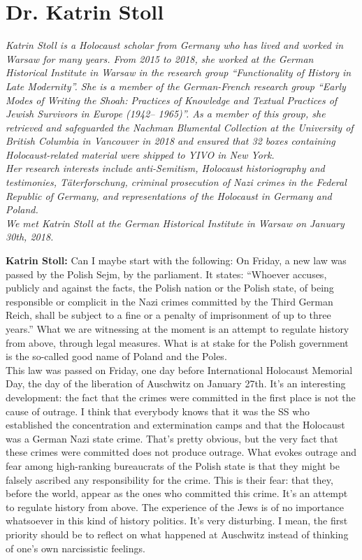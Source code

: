 \section{Dr. Katrin Stoll} 

\textit{Katrin Stoll is a Holocaust scholar from Germany who has lived and worked in Warsaw for many years. From 2015 to 2018, she worked at the German Historical Institute in Warsaw in the research group ``Functionality of History in Late Modernity''. She is a member of the German-French research group ``Early Modes of Writing the Shoah: Practices of Knowledge and Textual Practices of Jewish Survivors in Europe (1942– 1965)''. As a member of this group, she retrieved and safeguarded the Nachman Blumental Collection at the University of British Columbia in Vancouver in 2018 and ensured that 32 boxes containing Holocaust-related material were shipped to YIVO in New York. \\
Her research interests include anti-Semitism, Holocaust historiography and testimonies, Täterforschung, criminal prosecution of Nazi crimes in the Federal Republic of Germany, and representations of the Holocaust in Germany and Poland. \\
We met Katrin Stoll at the German Historical Institute in Warsaw on January 30th, 2018.}\par 
\vspace*{2em}
\textbf{Katrin Stoll:} Can I maybe start with the following: On Friday, a new law was passed by the Polish Sejm, by the parliament. It states: ``Whoever accuses, publicly and against the facts, the Polish nation or the Polish state, of being responsible or complicit in the Nazi crimes committed by the Third German Reich, shall be subject to a fine or a penalty of imprisonment of up to three years.'' What we are witnessing at the moment is an attempt to regulate history from above, through legal measures. What is at stake for the Polish government is the so-called good name of Poland and the Poles.\\ 
This law was passed on Friday, one day before International Holocaust Memorial Day, the day of the liberation of Auschwitz on January 27th. It’s an interesting development: the fact that the crimes were committed in the first place is not the cause of outrage. I think that everybody knows that it was the SS who established the concentration and extermination camps and that the Holocaust was a German Nazi state crime. That’s pretty obvious, but the very fact that these crimes were committed does not produce outrage. What evokes outrage and fear among high-ranking bureaucrats of the Polish state is that they might be falsely ascribed any responsibility for the crime. This is their fear: that they, before the world, appear as the ones who committed this crime. It’s an attempt to regulate history from above. The experience of the Jews is of no importance whatsoever in this kind of history politics. It's very disturbing. I mean, the first priority should be to reflect on what happened at Auschwitz instead of thinking of one’s own narcissistic feelings. 

